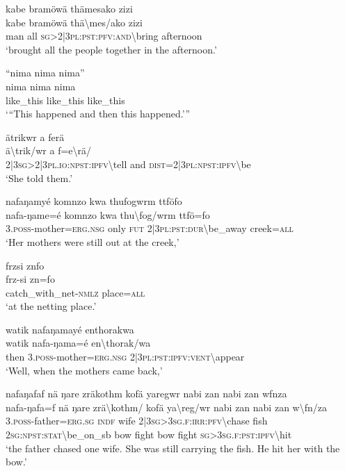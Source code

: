 \ea\label{ex:6:a1247}
kabe bramöwä thämesako zizi\\
\gll kabe	bramöwä	thä{\textbackslash}mes/ako	zizi\\
     man	all	\textsc{sg}>2|3\textsc{pl}:\textsc{pst}:\textsc{pfv}:\textsc{and}{\textbackslash}bring	afternoon\\
\glt `brought all the people together in the afternoon.'
\z

\ea\label{ex:6:a1249}
``nima nima nima''\\
\gll nima	nima	nima\\
     like\_this	like\_this	like\_this\\
\glt `{``}This happened and then this happened.'''
\z

\ea\label{ex:6:a1250}
ätrikwr a ferä\\
\gll ä{\textbackslash}trik/wr	a	f=e{\textbackslash}rä/\\
     2|3\textsc{sg}>2|3\textsc{pl}.\textsc{io}:\textsc{npst}:\textsc{ipfv}{\textbackslash}tell	and	\textsc{dist}=2|3\textsc{pl}:\textsc{npst}:\textsc{ipfv}{\textbackslash}be\\
\glt `She told them.'
\z

\ea\label{ex:6:a1251}
nafaŋamyé komnzo kwa thufogwrm ttföfo\\
\gll nafa-ŋame=é	komnzo	kwa	thu{\textbackslash}fog/wrm	ttfö=fo\\
     3.\textsc{poss}-mother=\textsc{erg}.\textsc{nsg}	only	\textsc{fut}	2|3\textsc{pl}:\textsc{pst}:\textsc{dur}{\textbackslash}be\_away	creek=\textsc{all}\\
\glt `Her mothers were still out at the creek,'
\z

\ea\label{ex:6:a1253}
frzsi znfo\\
\gll frz-si	zn=fo\\
     catch\_with\_net-\textsc{nmlz}	place=\textsc{all}\\
\glt `at the netting place.'
\z

\ea\label{ex:6:a1254}
watik nafaŋamayé enthorakwa\\
\gll watik	nafa-ŋama=é	en{\textbackslash}thorak/wa\\
     then	3.\textsc{poss}-mother=\textsc{erg}.\textsc{nsg}	2|3\textsc{pl}:\textsc{pst}:\textsc{ipfv}:\textsc{vent}{\textbackslash}appear\\
\glt `Well, when the mothers came back,'
\z

\ea\label{ex:6:a1257}
nafaŋafaf nä ŋare zräkothm kofä yaregwr nabi zan nabi zan wfnza\\
\gll nafa-ŋafa=f	nä	ŋare	zrä{\textbackslash}kothm/	kofä	ya{\textbackslash}reg/wr	nabi	zan	nabi	zan	w{\textbackslash}fn/za\\
     3.\textsc{poss}-father=\textsc{erg}.\textsc{sg}	\textsc{indf}	wife	2|3\textsc{sg}>3\textsc{sg}.\textsc{f}:\textsc{irr}:\textsc{pfv}{\textbackslash}chase	fish	2\textsc{sg}:\textsc{npst}:\textsc{stat}{\textbackslash}be\_on\_sb	bow	fight	bow	fight	\textsc{sg}>3\textsc{sg}.\textsc{f}:\textsc{pst}:\textsc{ipfv}{\textbackslash}hit\\
\glt `the father chased one wife. She was still carrying the fish. He hit her with the bow.'
\z


